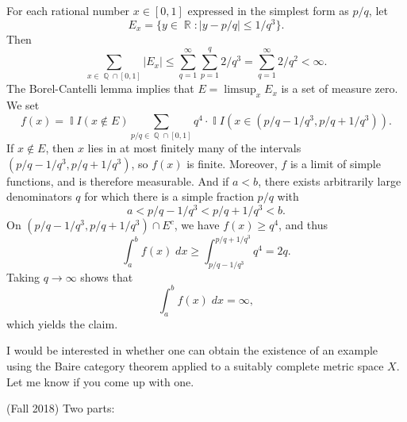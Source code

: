 \documentclass[answers]{exam}
\DeclareMathOperator{\RR}{\mathbb{R}}
\DeclareMathOperator{\QQ}{\mathbb{Q}}
\DeclareMathOperator{\II}{\mathbb{I}}
\begin{document}
\begin{questions}
\begin{solution}
    For each rational number $x \in [0,1]$ expressed in the simplest form as $p/q$, let
    \[ E_x = \{ y \in \RR: |y - p/q| \leq 1/q^3 \}. \]
    Then
    \[ \sum_{x \in \QQ \cap [0,1]} |E_x| \leq \sum_{q = 1}^\infty \sum_{p = 1}^q 2/q^3 = \sum_{q = 1}^\infty 2/q^2 < \infty. \]
    The Borel-Cantelli lemma implies that $E = \limsup_x E_x$ is a set of measure zero. We set
    \[ f(x) = \II{I}(x \not \in E) \sum_{p/q \in \QQ \cap [0,1]} q^4 \cdot \II{I}(x \in (p/q - 1/q^3, p/q + 1/q^3)). \]
    If $x \not \in E$, then $x$ lies in at most finitely many of the intervals $(p/q - 1/q^3, p/q + 1/q^3)$, so $f(x)$ is finite. Moreover, $f$ is a limit of simple functions, and is therefore measurable. And if $a < b$, there exists arbitrarily large denominators $q$ for which there is a simple fraction $p/q$ with
    \[ a < p/q - 1/q^3 < p/q + 1/q^3 < b. \]
    On $(p/q - 1/q^3, p/q + 1/q^3) \cap E^c$, we have $f(x) \geq q^4$, and thus
    \[ \int_a^b f(x)\; dx \geq \int_{p/q - 1/q^3}^{p/q + 1/q^3} q^4 = 2q. \]
    Taking $q \to \infty$ shows that
    \[ \int_a^b f(x)\; dx = \infty, \]
    which yields the claim.

    I would be interested in whether one can obtain the existence of an example using the Baire category theorem applied to a suitably complete metric space $X$. Let me know if you come up with one.
\end{solution}

\question (Fall 2018) Two parts:

    \begin{parts}

\end{parts}
\end{questions}
\end{document}
